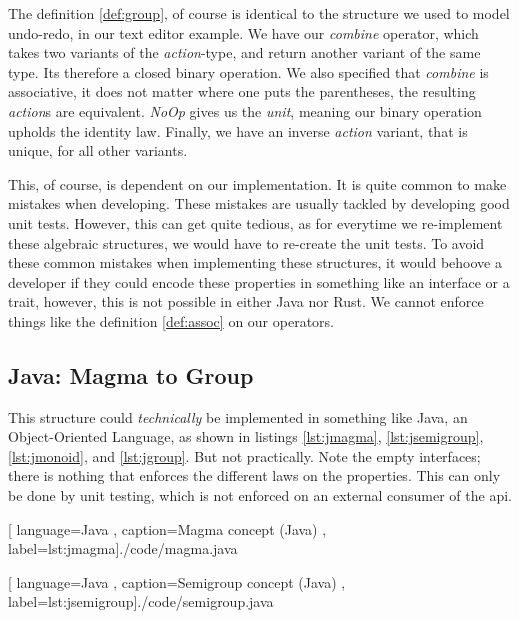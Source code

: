 The definition \ref{def:group}, of course is identical to the structure we used
to model undo-redo, in our text editor example. We have our \textit{combine}
operator, which takes two variants of the \textit{action}-type, and return
another variant of the same type. Its therefore a closed binary operation. We
also specified that \textit{combine} is associative, it does not matter where one
puts the parentheses, the resulting \textit{action}s are equivalent.
\textit{NoOp} gives us the \textit{unit}, meaning our binary operation upholds
the identity law. Finally, we have an inverse \textit{action} variant, that is
unique, for all other variants.

This, of course, is dependent on our implementation. It is quite common to make
mistakes when developing. These mistakes are usually tackled by developing good
unit tests. However, this can get quite tedious, as for everytime we re-implement
these algebraic structures, we would have to re-create the unit tests. To avoid
these common mistakes when implementing these structures, it would behoove a
developer if they could encode these properties in something like an interface or
a trait, however, this is not possible in either Java nor Rust. We cannot enforce
things like the definition \ref{def:assoc} on our operators.

\subsection{Java: Magma to Group}

This structure could \textit{technically} be implemented in something like Java,
an Object-Oriented Language, as shown in listings \ref{lst:jmagma},
\ref{lst:jsemigroup}, \ref{lst:jmonoid}, and \ref{lst:jgroup}. But not
practically. Note the empty interfaces; there is nothing that enforces the
different laws on the properties. This can only be done by unit testing, which
is not enforced on an external consumer of the \gls*{api}.

\begin{center}
  
    [ language=Java
    , caption={Magma concept (Java)}
    , label=lst:jmagma]{./code/magma.java}
\end{center}

\begin{center}
  
    [ language=Java
    , caption={Semigroup concept (Java)}
    , label=lst:jsemigroup]{./code/semigroup.java}
\end{center}

